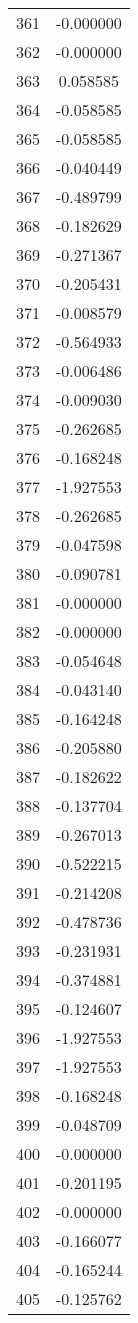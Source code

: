 \documentclass[12pt]{article}
\begin{document}
\begin{longtable}{@{}cc@{}}
361 & -0.000000 \\
362 & -0.000000 \\
363 & 0.058585 \\
364 & -0.058585 \\
365 & -0.058585 \\
366 & -0.040449 \\
367 & -0.489799 \\
368 & -0.182629 \\
369 & -0.271367 \\
370 & -0.205431 \\
371 & -0.008579 \\
372 & -0.564933 \\
373 & -0.006486 \\
374 & -0.009030 \\
375 & -0.262685 \\
376 & -0.168248 \\
377 & -1.927553 \\
378 & -0.262685 \\
379 & -0.047598 \\
380 & -0.090781 \\
381 & -0.000000 \\
382 & -0.000000 \\
383 & -0.054648 \\
384 & -0.043140 \\
385 & -0.164248 \\
386 & -0.205880 \\
387 & -0.182622 \\
388 & -0.137704 \\
389 & -0.267013 \\
390 & -0.522215 \\
391 & -0.214208 \\
392 & -0.478736 \\
393 & -0.231931 \\
394 & -0.374881 \\
395 & -0.124607 \\
396 & -1.927553 \\
397 & -1.927553 \\
398 & -0.168248 \\
399 & -0.048709 \\
400 & -0.000000 \\
401 & -0.201195 \\
402 & -0.000000 \\
403 & -0.166077 \\
404 & -0.165244 \\
405 & -0.125762 \\

\end{longtable}
\end{document}

